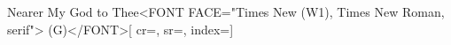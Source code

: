 {Nearer My God to Thee<FONT FACE="Times New (W1), Times New Roman, serif"> (G)</FONT>}[
    cr={},
    sr={},
    index={}]
